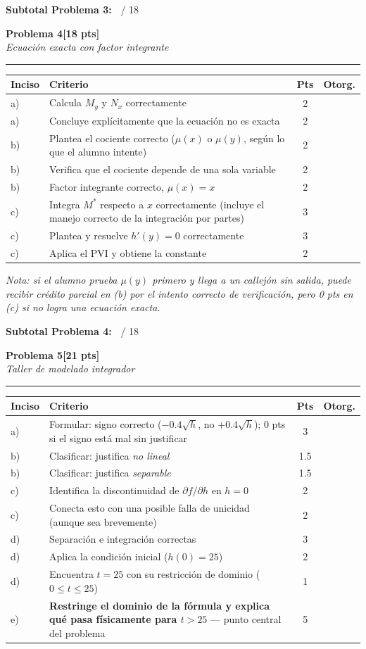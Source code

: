 \documentclass[11pt,letterpaper]{article}
\makeatletter
\newcommand{\problema}[3]{%
  \bigskip\bigskip\noindent
  {\Large\textbf{Problema #1}}\hfill\textbf{[#2 pts]}\\[3pt]
  {\small\itshape #3}\par
  \vspace{2pt}\hrule\vspace{8pt}
}
\newenvironment{tablarubrica}{%
  \begin{tabular}{@{}p{1.1cm}Lcc@{}}
  \toprule
  \textbf{Inciso} & \textbf{Criterio} & \textbf{Pts} & \textbf{Otorg.} \\
  \midrule
}{%
  \bottomrule
  \end{tabular}
}
\makeatother
\begin{document}
\medskip
\noindent\textbf{Subtotal Problema 3:\ } \underline{\hspace{2.5cm}} / 18

\newpage
\problema{4}{18}{Ecuación exacta con factor integrante}

\begin{tablarubrica}
a) & Calcula $M_y$ y $N_x$ correctamente & 2 & \\
a) & Concluye explícitamente que la ecuación no es exacta & 2 & \\
b) & Plantea el cociente correcto ($\mu(x)$ o $\mu(y)$, según lo que el alumno intente) & 2 & \\
b) & Verifica que el cociente depende de una sola variable & 2 & \\
b) & Factor integrante correcto, $\mu(x)=x$ & 2 & \\
c) & Integra $M^*$ respecto a $x$ correctamente (incluye el manejo correcto de la integración por partes) & 3 & \\
c) & Plantea y resuelve $h'(y)=0$ correctamente & 3 & \\
c) & Aplica el PVI y obtiene la constante & 2 & \\
\end{tablarubrica}

\textit{Nota: si el alumno prueba $\mu(y)$ primero y llega a un callejón sin salida, puede recibir crédito parcial en (b) por el intento correcto de verificación, pero 0 pts en (c) si no logra una ecuación exacta.}

\medskip
\noindent\textbf{Subtotal Problema 4:\ } \underline{\hspace{2.5cm}} / 18

\problema{5}{21}{Taller de modelado integrador}

\begin{tablarubrica}
a) & Formular: signo correcto ($-0.4\sqrt h$, no $+0.4\sqrt h$); 0 pts si el signo está mal sin justificar & 3 & \\
b) & Clasificar: justifica \emph{no lineal} & 1.5 & \\
b) & Clasificar: justifica \emph{separable} & 1.5 & \\
c) & Identifica la discontinuidad de $\partial f/\partial h$ en $h=0$ & 2 & \\
c) & Conecta esto con una posible falla de unicidad (aunque sea brevemente) & 2 & \\
d) & Separación e integración correctas & 3 & \\
d) & Aplica la condición inicial ($h(0)=25$) & 2 & \\
d) & Encuentra $t=25$ con su restricción de dominio ($0\le t\le25$) & 1 & \\
e) & \textbf{Restringe el dominio de la fórmula y explica qué pasa físicamente para $t>25$} — punto central del problema & 5 & \\
\end{tablarubrica}
\end{document}
